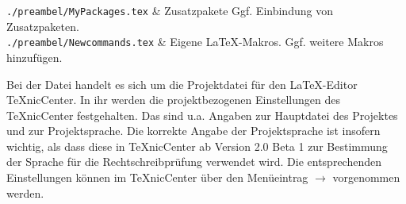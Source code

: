 \begin{table}[htbp]
\begin{tabularx}{\columnwidth}
\texttt{./preambel/MyPackages.tex}        & Zusatzpakete
                                          Ggf. Einbindung von Zusatzpaketen.\\
\texttt{./preambel/Newcommands.tex}       & Eigene \LaTeX{}-Makros.
                                          Ggf. weitere Makros hinzufügen.\\
\bottomrule%
\end{tabularx}%
\caption[Dateien und Verzeichnisse der Vorlage]{Dateien und Verzeichnisse der Vorlage}%
\label{tab:StrukturDerVorlage}%
\end{table}

Bei der Datei  handelt es sich um die Projektdatei für den \LaTeX-Editor TeXnicCenter.
In ihr werden die projektbezogenen Einstellungen des TeXnicCenter festgehalten.
Das sind u.a. Angaben zur Hauptdatei des Projektes und zur Projektsprache.
Die korrekte Angabe der Projektsprache ist insofern wichtig, als dass diese in TeXnicCenter ab Version 2.0 Beta 1 zur Bestimmung der Sprache für die Rechtschreibprüfung verwendet wird.
Die entsprechenden Einstellungen können im TeXnicCenter über den Menüeintrag  $\rightarrow$  vorgenommen werden.


